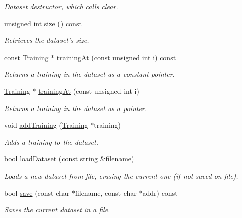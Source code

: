 \begin{DoxyCompactItemize}
\begin{DoxyCompactList}\small\item\em \hyperlink{class_dataset}{Dataset} destructor, which calls clear. \end{DoxyCompactList}\item 
unsigned int \hyperlink{class_dataset_a389855d6b88c8257041bcbc489759aae}{size} () const 
\begin{DoxyCompactList}\small\item\em Retrieves the dataset's size. \end{DoxyCompactList}\item 
const \hyperlink{class_training}{Training} $\ast$ \hyperlink{class_dataset_af776f6046312827aed048d641e29449b}{training\-At} (const unsigned int i) const 
\begin{DoxyCompactList}\small\item\em Returns a training in the dataset as a constant pointer. \end{DoxyCompactList}\item 
\hyperlink{class_training}{Training} $\ast$ \hyperlink{class_dataset_adf05adb75cc0692104dc809ab030e967}{training\-At} (const unsigned int i)
\begin{DoxyCompactList}\small\item\em Returns a training in the dataset as a pointer. \end{DoxyCompactList}\item 
void \hyperlink{class_dataset_a3dd1b2db5490c75c59b23680bb7b8b53}{add\-Training} (\hyperlink{class_training}{Training} $\ast$training)
\begin{DoxyCompactList}\small\item\em Adds a training to the dataset. \end{DoxyCompactList}\item 
bool \hyperlink{class_dataset_a371d55ca351e5f805d8d5c7ffe51c829}{load\-Dataset} (const string \&filename)
\begin{DoxyCompactList}\small\item\em Loads a new dataset from file, erasing the current one (if not saved on file). \end{DoxyCompactList}\item 
bool \hyperlink{class_dataset_a97193aebac43df3a98852a8a675702ab}{save} (const char $\ast$filename, const char $\ast$addr) const 
\begin{DoxyCompactList}\small\item\em Saves the current dataset in a file. \end{DoxyCompactList}\item 

\end{DoxyCompactItemize}
